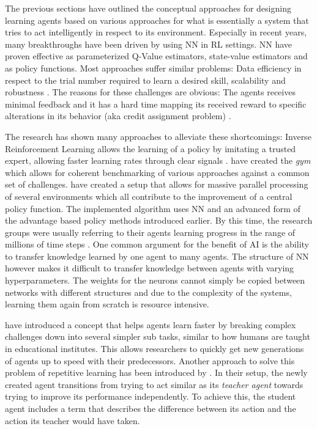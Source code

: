 The previous sections have outlined the conceptual approaches for designing learning agents based on various approaches
for what is essentially a system that tries to act intelligently in respect to its environment. Especially in recent
years, many breakthroughs have been driven by using \ac {NN} in \ac {RL} settings. \ac {NN} have proven effective as
parameterized Q-Value estimators, state-value estimators and as policy functions. Most approaches suffer similar
problems: Data efficiency in respect to the trial number required to learn a desired skill, scalability and robustness
\citep{proximalpolicyopt}. The reasons for these challenges are obvious: The agents receives minimal feedback and it has
a hard time mapping its received reward to specific alterations in its behavior (aka credit assignment problem)
\citep{arulkumaran2017brief}.  

The research has shown many approaches to alleviate these shortcomings: Inverse Reinforcement Learning allows the
learning of a policy by imitating a trusted expert, allowing faster learning rates through clear signals
\citep{NG2000InvReinf}. \citet{brockman2016openai} have created the \emph{gym} which allows for coherent benchmarking of
various approaches against a common set of challenges. \citet{hafner2017agents} have created a setup that allows for
massive parallel processing of several environments which all contribute to the improvement of a central policy
function. The implemented algorithm uses \ac {NN} and an advanced form of the advantage based policy methods introduced
earlier. By this time, the research groups were usually referring to their agents learning progress in the range of
millions of time steps \citep{proximalpolicyopt}. One common argument for the benefit of \ac {AI} is the ability to
transfer knowledge learned by one agent to many agents. The structure of \ac {NN} however makes it difficult to transfer
knowledge between agents with varying hyperparameters. The weights for the neurons cannot simply be copied between
networks with different structures and due to the complexity of the systems, learning them again from scratch is
resource intensive.

\citet{matiisen2017teacher} have introduced a concept that helps agents learn faster by breaking complex challenges down
into several simpler sub tasks, similar to how humans are taught in educational institutes. This allows researchers to
quickly get new generations of agents up to speed with their predecessors. Another approach to solve this problem of
repetitive learning has been introduced by \citet{schmitt2018kickstarting}. In their setup, the newly created agent
transitions from trying to act similar as its \emph{teacher agent} towards trying to improve its performance
independently. To achieve this, the student agent includes a term that describes the difference between its action and
the action its teacher would have taken.

